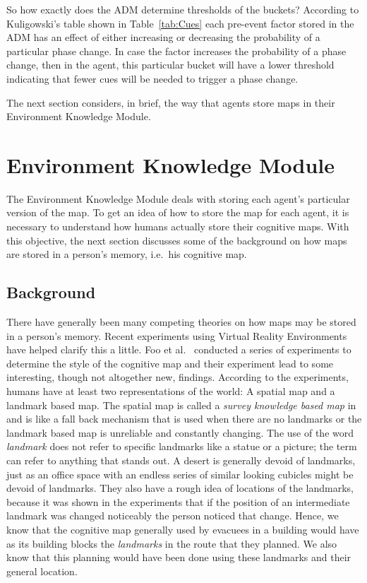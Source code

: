So how exactly does the ADM determine thresholds of the buckets? According to Kuligowski's table shown in Table~\ref{tab:Cues} each pre-event factor stored in the ADM has an effect of either increasing or decreasing the probability of a particular phase change. In case the factor increases the probability of a phase change, then in the agent, this particular bucket will have a lower threshold indicating that fewer cues will be needed to trigger a phase change.

The next section considers, in brief, the way that agents store maps in their Environment Knowledge Module.

\section{Environment Knowledge Module}
\label{CFW:EnvironmentKnowledgeModule}
The Environment Knowledge Module deals with storing each agent's particular version of the map. To get an idea of how to store the map for each agent, it is necessary to understand how humans actually store their cognitive maps. With this objective, the next section discusses some of the background on how maps are stored in a person's memory, i.e.\ his cognitive map.

\subsection{Background}
\label{CFW:CognitiveMap}
There have generally been many competing theories on how maps may be stored in a person's memory. Recent experiments using Virtual Reality Environments~\cite{Foo:2005kw} have helped clarify this a little. Foo et al.~\cite{Foo:2005kw} conducted a series of experiments to determine the style of the cognitive map and their experiment lead to some interesting, though not altogether new, findings. According to the experiments, humans have at least two representations of the world: A spatial map and a landmark based map. The spatial map is called a \emph{survey knowledge based map} in~\cite{Foo:2005kw} and is like a fall back mechanism that is used when there are no landmarks or the landmark based map is unreliable and constantly changing. The use of the word \emph{landmark} does not refer to specific landmarks like a statue or a picture; the term can refer to anything that stands out. A desert is generally devoid of landmarks, just as an office space with an endless series of similar looking cubicles might be devoid of landmarks. They also have a rough idea of locations of the landmarks, because it was shown in the experiments that if the position of an intermediate landmark was changed noticeably the person noticed that change. Hence, we know that the cognitive map generally used by evacuees in a building would have as its building blocks the \emph{landmarks} in the route that they planned. We also know that this planning would have been done using these landmarks and their general location.

